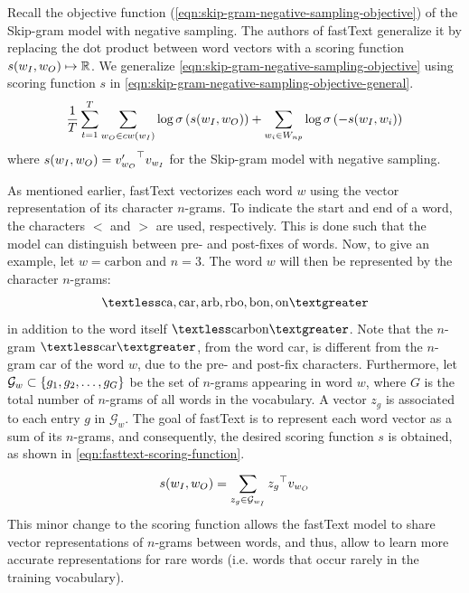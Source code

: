 Recall the objective function (\cref{eqn:skip-gram-negative-sampling-objective}) of the Skip-gram model with negative sampling. The authors of fastText generalize it by replacing the dot product between word vectors with a scoring function $s(w_I, w_O) \mapsto \mathbb{R}$. We generalize \cref{eqn:skip-gram-negative-sampling-objective} using scoring function $s$ in \cref{eqn:skip-gram-negative-sampling-objective-general}.
\begin{align}
    \frac{1}{T} \sum\limits_{t=1}^{T} \sum\limits_{w_O \in cw(w_I)}^{} \log \sigma \left( s(w_I, w_O) \right) + \sum\limits_{w_i \in W_{np}}^{} \log \sigma \left( -s(w_I, w_i) \right)
    \label{eqn:skip-gram-negative-sampling-objective-general}
\end{align}
where $s(w_I, w_O)={v'_{w_O}}^\top v_{w_I}$ for the Skip-gram model with negative sampling.

As mentioned earlier, fastText vectorizes each word $w$ using the vector representation of its character $n$-grams. To indicate the start and end of a word, the characters $<$ and $>$ are used, respectively. This is done such that the model can distinguish between pre- and post-fixes of words. Now, to give an example, let $w=\text{carbon}$ and $n=3$. The word $w$ will then be represented by the character $n$-grams:
\begin{align*}
    \textless\text{ca}, \text{car}, \text{arb}, \text{rbo}, \text{bon}, \text{on}\textgreater
\end{align*}
in addition to the word itself $\textless\text{carbon}\textgreater$. Note that the $n$-gram $\textless\text{car}\textgreater$, from the word car, is different from the $n$-gram car of the word $w$, due to the pre- and post-fix characters. Furthermore, let $\mathcal{G}_w \subset \left\{g_1, g_2, \ldots, g_G\right\}$ be the set of $n$-grams appearing in word $w$, where $G$ is the total number of $n$-grams of all words in the vocabulary. A vector $z_g$ is associated to each entry $g$ in $\mathcal{G}_w$. The goal of fastText is to represent each word vector as a sum of its $n$-grams, and consequently, the desired scoring function $s$ is obtained, as shown in \cref{eqn:fasttext-scoring-function}.
\begin{align}
    s(w_I, w_O) = \sum\limits_{z_g \in \mathcal{G}_{w_I}}^{} {z_g}^\top v_{w_O}
    \label{eqn:fasttext-scoring-function}
\end{align}
This minor change to the scoring function allows the fastText model to share vector representations of $n$-grams between words, and thus, allow to learn more accurate representations for rare words (i.e. words that occur rarely in the training vocabulary).

